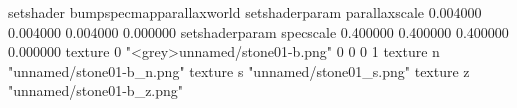 setshader bumpspecmapparallaxworld
setshaderparam parallaxscale 0.004000 0.004000 0.004000 0.000000
setshaderparam specscale 0.400000 0.400000 0.400000 0.000000
texture 0 "<grey>unnamed/stone01-b.png" 0 0 0 1
texture n "unnamed/stone01-b_n.png"
texture s "unnamed/stone01_s.png"
texture z "unnamed/stone01-b_z.png"